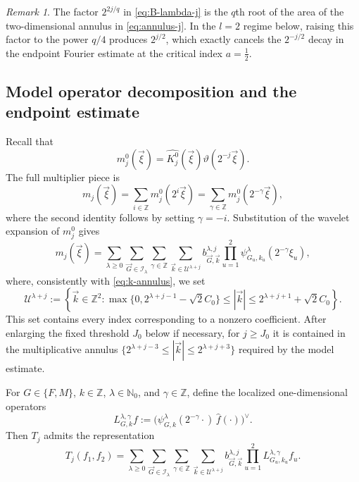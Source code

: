 \documentclass[11pt]{amsart}
\theoremstyle{remark}
\newtheorem{remark}[definition]{Remark}
\numberwithin{equation}{section}
\newcommand{\cI}{\mathcal I}
\newcommand{\cU}{\mathcal U}
\begin{document}
	\begin{remark}\label{rem:area-factor}
		The factor \(2^{2j/q}\) in \eqref{eq:B-lambda-j} is the \(q\)th root of
		the area of the two-dimensional annulus in \eqref{eq:annulus-j}. In the
		\(l=2\) regime below, raising this factor to the power \(q/4\) produces
		\(2^{j/2}\), which exactly cancels the \(2^{-j/2}\) decay in the endpoint
		Fourier estimate at the critical index \(a=\frac12\).
	\end{remark}
	
	\subsection[Model operator decomposition and the endpoint estimate]
	{Model operator decomposition and the endpoint estimate}
	
	Recall that
	\[
	m_j^0(\vec\xi)=\widehat{K_j^0}(\vec\xi)\vartheta(2^{-j}\vec\xi).
	\]
	The full multiplier piece is
	\[
	m_j(\vec\xi)
	=
	\sum_{i\in\mathbb Z} m_j^0(2^i\vec\xi)
	=
	\sum_{\gamma\in\mathbb Z} m_j^0(2^{-\gamma}\vec\xi),
	\]
	where the second identity follows by setting \(\gamma=-i\). Substitution of
	the wavelet expansion of \(m_j^0\) gives
	\[
	m_j(\vec\xi)
	=
	\sum_{\lambda\ge0}\sum_{\vec G\in\cI_\lambda}\sum_{\gamma\in\mathbb Z}
	\sum_{\vec k\in\cU^{\lambda+j}}
	b_{\vec G,\vec k}^{\lambda,j}
	\prod_{u=1}^{2}\psi_{G_u,k_u}^\lambda(2^{-\gamma}\xi_u),
	\]
	where, consistently with \eqref{eq:k-annulus}, we set
	\begin{equation}\label{eq:U-def}
		\cU^{\lambda+j}:=
		\left\{\vec k\in\mathbb Z^2:
		\max\{0,2^{\lambda+j-1}-\sqrt2C_0\}
		\le|\vec k|\le2^{\lambda+j+1}+\sqrt2C_0
		\right\}.
	\end{equation}
	This set contains every index corresponding to a nonzero coefficient.  After
	enlarging the fixed threshold \(J_0\) below if necessary, for \(j\ge J_0\) it
	is contained in the multiplicative annulus
	\(\{2^{\lambda+j-3}\le|\vec k|\le2^{\lambda+j+3}\}\) required by the model
	estimate.
	
	For \(G\in\{F,M\}\), \(k\in\mathbb Z\), \(\lambda\in\mathbb N_0\), and \(\gamma\in\mathbb Z\), define the localized one-dimensional operators
	\[
	L_{G,k}^{\lambda,\gamma}f
	:=
	\bigl(\psi_{G,k}^\lambda(2^{-\gamma}\cdot)\,\widehat f(\cdot)\bigr)^\vee.
	\]
	Then \(T_j\) admits the representation
	\begin{equation}\label{eq:model-decomp}
		T_j(f_1,f_2)
		=
		\sum_{\lambda\ge0}\sum_{\vec G\in\cI_\lambda}\sum_{\gamma\in\mathbb Z}
		\sum_{\vec k\in\cU^{\lambda+j}}
		b_{\vec G,\vec k}^{\lambda,j}
		\prod_{u=1}^{2}L_{G_u,k_u}^{\lambda,\gamma}f_u.
	\end{equation}
	
\end{document}
